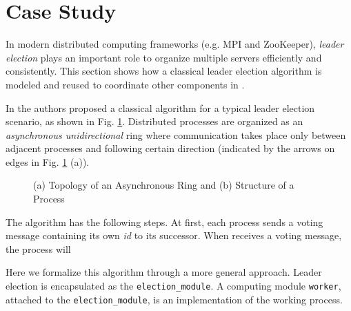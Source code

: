 \section{Case Study}
\label{sec:casestudy}

In modern distributed computing frameworks (e.g. MPI\cite{mpibook} and ZooKeeper\cite{JunqueiraZab2011}), \emph{leader election} plays an important role to organize multiple servers efficiently and consistently. This section shows how a classical leader election algorithm is modeled and reused to coordinate other components in \lang{}.

In \cite{HagitDistributed2004} the authors proposed a classical algorithm for a typical leader election scenario, as shown in Fig. \ref{fig:leaderelection}. Distributed processes are organized as an \emph{asynchronous unidirectional} ring where communication takes place only between adjacent processes and following certain direction (indicated by the arrows on edges in Fig. \ref{fig:leaderelection} (a)).

\begin{figure}
	\centering
	\resizebox{.7\textwidth}{!}{
        
    }
	\caption{(a) Topology of an Asynchronous Ring and (b) Structure of a Process}
	\label{fig:leaderelection}
\end{figure}

The algorithm has the following steps. At first, each process sends a voting message containing its own \emph{id} to its successor. When receives a voting message, the process will

Here we formalize this algorithm through a more general approach. Leader election is encapsulated as the \texttt{election\_module}. A computing module \texttt{worker},  attached to the \texttt{election\_module}, is an implementation of the working process. 

